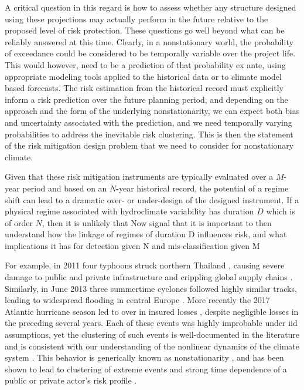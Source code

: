 \documentclass[12pt]{article}
\begin{document}
A critical question in this regard is how to assess whether any structure designed using these projections may actually perform in the future relative to the proposed level of risk protection.
These questions go well beyond what can be reliably answered at this time.
Clearly, in a nonstationary world, the probability of exceedance could be considered to be temporally variable over the project life.
This would however, need to be a prediction of that probability ex ante, using appropriate modeling tools applied to the historical data or to climate model based forecasts.
The risk estimation from the historical record must explicitly inform a risk prediction over the future planning period, and depending on the approach and the form of the underlying nonstationarity, we can expect both bias and uncertainty associated with the prediction, and we need temporally varying probabilities to address the inevitable risk clustering.
This is then the statement of the risk mitigation design problem that we need to consider for nonstationary climate.

Given that these risk mitigation instruments are typically evaluated over a $M$-year period and based on an $N$-year historical record, the potential of a regime shift can lead to a dramatic over- or under-design of the designed instrument.
If a physical regime associated with hydroclimate variability has duration $D$ which is of order $N$, then it is unlikely that 
Now signal that it is important to then understand how the linkage of regimes of duration D influences risk, and what implications it has for detection given N and mis-classification given M

For example, in 2011 four typhoons struck northern Thailand \citep{Gale2013}, causing severe damage to public and private infrastructure and crippling global supply chains \citep{Haraguchi2015}.
Similarly, in June 2013 three summertime cyclones followed highly similar tracks, leading to widespread flooding in central Europe \citep{Grams2014}.
More recently the 2017 Atlantic hurricane season led to over  in insured losses \citep{SwissRe2017}, despite negligible losses in the preceding several years.
Each of these events was highly improbable under \gls{iid} assumptions, yet the clustering of such events is well-documented in the literature \citep{Hurst1951,Matalas2012,Merz2014} and is consistent with our understanding of the nonlinear dynamics of the climate system \citep{Hannachi2017}.
This behavior is generically known as nonstationarity \citep{Milly2008}, and has been shown to lead to clustering of extreme events and strong time dependence of a public or private actor's risk profile \citep{Bonnafous2017a,Bonnafous2017b}.
\end{document}
